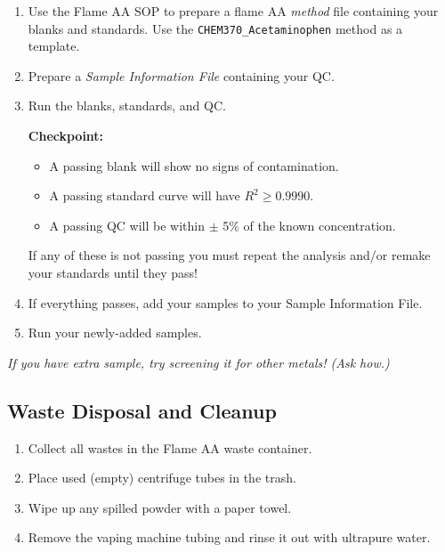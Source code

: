 \documentclass[]{tufte-book}
\providecommand{\tightlist}{%
  \setlength{\itemsep}{0pt}\setlength{\parskip}{0pt}}
\begin{document}
\begin{enumerate}
\def\labelenumi{\arabic{enumi}.}
\tightlist
\item
  Use the Flame AA SOP to prepare a flame AA \emph{method} file containing your blanks and standards. Use the \texttt{CHEM370\_Acetaminophen} method as a template.
\item
  Prepare a \emph{Sample Information File} containing your QC.
\item
  Run the blanks, standards, and QC.

  \begin{marginfigure}
   \textbf{Checkpoint:}

   \begin{itemize}
   \tightlist
   \item
     A passing blank will show no signs of contamination.\\
   \item
     A passing standard curve will have \(R^2 \ge 0.9990\).\\
   \item
     A passing QC will be within \(\pm\) 5\% of the known concentration.
   \end{itemize}

   If any of these is not passing you must repeat the analysis and/or
   remake your standards until they pass!
   \end{marginfigure}
\item
  If everything passes, add your samples to your Sample Information File.
\item
  Run your newly-added samples.
\end{enumerate}

\emph{If you have extra sample, try screening it for other metals! (Ask how.)}

\hypertarget{waste-disposal-and-cleanup-6}{%
\subsection{Waste Disposal and Cleanup}\label{waste-disposal-and-cleanup-6}}

\begin{enumerate}
\def\labelenumi{\arabic{enumi}.}
\tightlist
\item
  Collect all wastes in the Flame AA waste container.
\item
  Place used (empty) centrifuge tubes in the trash.
\item
  Wipe up any spilled powder with a paper towel.
\item
  Remove the vaping machine tubing and rinse it out with ultrapure water.
\end{enumerate}
\end{document}
